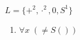 \documentclass[a4paper, 12pt]{report}
\theoremstyle{definition}
\theoremstyle{remark}
\begin{document}
\begin{large}
    $L = \{+^{2}, \cdot^2, 0, S^{1}\}$
    \begin{enumerate}
        \item $\forall x\; (\neq S())$
    \end{enumerate}
\end{large}
\end{document}
